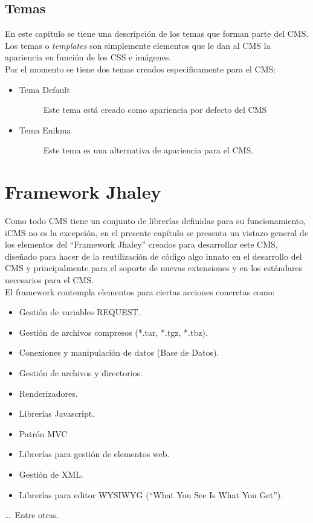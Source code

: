 \subsection{Temas}
En este cap\'itulo se tiene una descripci\'on de los temas que forman parte del CMS. Los temas o \textit{templates} son simplemente elementos que le dan al CMS la apariencia en funci\'on de los CSS e im\'agenes.\\
Por el momento se tiene dos temas creados especificamente para el CMS:

\begin{itemize}
\item \begin{description}
	\item[Tema Default] Este tema est\'a creado como apariencia por defecto del CMS
\end{description}
\item \begin{description}
	\item[Tema Enikma] Este tema es una alternativa de apariencia para el CMS.
\end{description}
\end{itemize}

\section{Framework Jhaley}
Como todo CMS tiene un conjunto de librer\'ias definidas para su funcionamiento, iCMS no es la excepci\'on, en el presente cap\'itulo se presenta un vistazo general de los elementos del ``Framework Jhaley'' creados para desarrollar este CMS, dise\~nado para hacer de la reutilizaci\'on de c\'odigo algo innato en el desarrollo del CMS y principalmente para el soporte de nuevas extensiones y en los est\'andares necesarios para el CMS.\\
El framework contempla elementos para ciertas acciones concretas como: 
\begin{itemize}
\item Gesti\'on de variables REQUEST.
\item Gesti\'on de archivos compresos (*.tar, *.tgz, *.tbz).
\item Conexiones y manipulaci\'on de datos (Base de Datos).
\item Gesti\'on de archivos y directorios.
\item Renderizadores.
\item Librer\'ias Javascript.
\item Patr\'on MVC
\item Librer\'ias para gesti\'on de elementos web.
\item Gesti\'on de XML.
\item Librer\'ias para editor WYSIWYG (``What You See Is What You Get'').
\end{itemize}
\ldots\ Entre otras.

